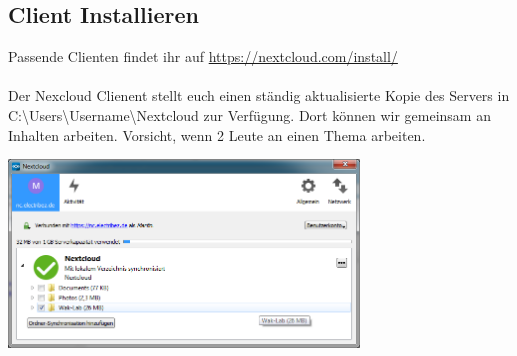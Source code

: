 \subsection{Client Installieren}
Passende Clienten findet ihr auf \url{https://nextcloud.com/install/}\\
\ \\
Der Nexcloud Clienent stellt euch einen ständig aktualisierte Kopie des Servers in C:\textbackslash Users\textbackslash Username\textbackslash Nextcloud zur Verfügung. Dort können wir gemeinsam an Inhalten arbeiten. Vorsicht, wenn 2 Leute an einen Thema arbeiten.\\
 
\begin{minipage}[t]{\textwidth}
  \centering
  \includegraphics[height=5cm]{pictures/NextcloudWinClient.png}
  \label{img:NextcloudWinClient}
\end{minipage}





